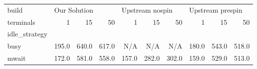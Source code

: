 \begin{tabular}{lrrrrrrrrr}
\toprule
build & \multicolumn{3}{l}{Our Solution} & \multicolumn{3}{l}{Upstream nospin} & \multicolumn{3}{l}{Upstream prespin} \\
terminals &           1  &     15 &     50 &              1  &     15 &     50 &               1  &     15 &     50 \\
idle\_strategy &              &        &        &                 &        &        &                  &        &        \\
\midrule
busy          &        195.0 &  640.0 &  617.0 &             N/A &    N/A &    N/A &            180.0 &  543.0 &  518.0 \\
mwait         &        172.0 &  581.0 &  558.0 &           157.0 &  282.0 &  302.0 &            159.0 &  529.0 &  513.0 \\
\bottomrule
\end{tabular}
